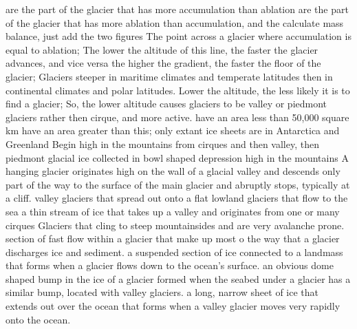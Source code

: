 		 are the part of the glacier that has more accumulation than ablation
		 are the part of the glacier that has more ablation than accumulation, and the calculate mass balance, just add the two figures
		 The point across a glacier where accumulation is equal to ablation; The lower the altitude of this line, the faster the glacier advances, and vice versa
		 the higher the gradient, the faster the floor of the glacier; Glaciers steeper in maritime climates and temperate latitudes then in continental climates and polar latitudes.
		Lower the altitude, the less likely it is to find a glacier; So, the lower altitude causes glaciers to be valley or piedmont glaciers rather then cirque, and more active.
		 have an area less than 50,000 square km
		 have an area greater than this; only extant ice sheets are in Antarctica and Greenland
		 Begin high in the mountains from cirques and then valley, then piedmont
		 glacial ice collected in bowl shaped depression high in the mountains 
		  A hanging glacier originates high on the wall of a glacial valley and descends only part of the way to the surface of the main glacier and abruptly stops, typically at a cliff.
		 valley glaciers that spread out onto a flat lowland
		 glaciers that flow to the sea
		 a thin stream of ice that takes up a valley and originates from one or many cirques
		 Glaciers that cling to steep mountainsides and are very avalanche prone.
	     section of fast flow within a glacier that make up most o the way that a glacier discharges ice and sediment.
		 a suspended section of ice connected to a landmass that forms when a glacier flows down to the ocean’s surface.
		 an obvious dome shaped bump in the ice of a glacier formed when the seabed under a glacier has a similar bump, located with valley glaciers.
		 a long, narrow sheet of ice that extends out over the ocean that forms when a valley glacier moves very rapidly onto the ocean.
